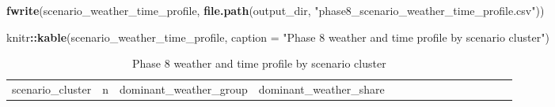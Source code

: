\documentclass[
]{article}
\newenvironment{Shaded}{\begin{snugshade}}{\end{snugshade}}
\newcommand{\AttributeTok}[1]{\textcolor[rgb]{0.13,0.29,0.53}{#1}}
\newcommand{\FunctionTok}[1]{\textcolor[rgb]{0.13,0.29,0.53}{\textbf{#1}}}
\newcommand{\NormalTok}[1]{#1}
\newcommand{\SpecialCharTok}[1]{\textcolor[rgb]{0.81,0.36,0.00}{\textbf{#1}}}
\newcommand{\StringTok}[1]{\textcolor[rgb]{0.31,0.60,0.02}{#1}}
\begin{document}
\begin{Shaded}
\begin{Highlighting}[]
\FunctionTok{fwrite}\NormalTok{(scenario\_weather\_time\_profile, }\FunctionTok{file.path}\NormalTok{(output\_dir, }\StringTok{"phase8\_scenario\_weather\_time\_profile.csv"}\NormalTok{))}

\NormalTok{knitr}\SpecialCharTok{::}\FunctionTok{kable}\NormalTok{(scenario\_weather\_time\_profile, }\AttributeTok{caption =} \StringTok{"Phase 8 weather and time profile by scenario cluster"}\NormalTok{)}
\end{Highlighting}
\end{Shaded}

\begin{longtable}[]{@{}
  >{\raggedleft\arraybackslash}p{}
  >{\raggedleft\arraybackslash}p{}
  >{\raggedright\arraybackslash}p{}
  >{\raggedleft\arraybackslash}p{}
  >{\raggedright\arraybackslash}p{}
  >{\raggedleft\arraybackslash}p{}
  >{\raggedleft\arraybackslash}p{}
  >{\raggedleft\arraybackslash}p{}
  >{\raggedleft\arraybackslash}p{}
  >{\raggedleft\arraybackslash}p{}
  >{\raggedleft\arraybackslash}p{}
  >{\raggedleft\arraybackslash}p{}
  >{\raggedleft\arraybackslash}p{}
  >{\raggedleft\arraybackslash}p{}
  >{\raggedleft\arraybackslash}p{}@{}}
\caption{Phase 8 weather and time profile by scenario
cluster}\tabularnewline
\toprule\noalign{}
\begin{minipage}[b]{\linewidth}\raggedleft
scenario\_cluster
\end{minipage} & \begin{minipage}[b]{\linewidth}\raggedleft
n
\end{minipage} & \begin{minipage}[b]{\linewidth}\raggedright
dominant\_weather\_group
\end{minipage} & \begin{minipage}[b]{\linewidth}\raggedleft
dominant\_weather\_share
\end{minipage} & \begin{minipage}[b]{\linewidth}\raggedright

\end{minipage}
\end{longtable}
\end{document}
